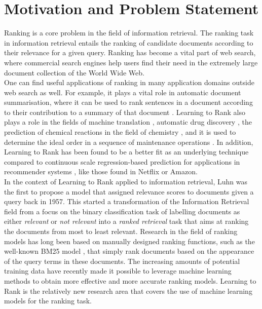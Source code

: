 \section{Motivation and Problem Statement}
\label{sec:motivation}
Ranking is a core problem in the field of information retrieval. The ranking task in information retrieval entails the ranking of candidate documents according to their relevance for a given query. Ranking has become a vital part of web search, where commercial search engines help users find their need in the extremely large document collection of the World Wide Web.\\

One can find useful applications of ranking in many application domains outside web search as well. For example, it plays a vital role in automatic document summarisation, where it can be used to rank sentences in a document according to their contribution to a summary of that document 
\cite{Bravo-Marquez2012}. Learning to Rank also plays a role in the fields of machine translation \cite{Hopkins2011}, automatic drug discovery \cite{Agarwal2010b}, the prediction of chemical reactions in the field of chemistry \cite{Kayala2011}, and it is used to determine the ideal order in a sequence of maintenance operations \cite{Rudin2009}. In addition, Learning to Rank has been found to be a better fit as an underlying technique compared to continuous scale regression-based prediction for applications in recommender systems \cite{Adomavicius2005,McNee2006}, like those found in Netflix or Amazon.\\

In the context of Learning to Rank applied to information retrieval, Luhn \cite{Luhn1957} was the first to propose a model that assigned relevance scores to documents given a query back in 1957. This started a transformation of the Information Retrieval field from a focus on the binary classification task of labelling documents as either \emph{relevant} or \emph{not relevant} into a \emph{ranked retrieval} task that aims at ranking the documents from most to least relevant. Research in the field of ranking models has long been based on manually designed ranking functions, such as the well-known BM25 model \cite{Robertson1994}, that simply rank documents based on the appearance of the query terms in these documents. The increasing amounts of potential training data have recently made it possible to leverage machine learning methods to obtain more effective and more accurate ranking models. Learning to Rank is the relatively new research area that covers the use of machine learning models for the ranking task.\\

